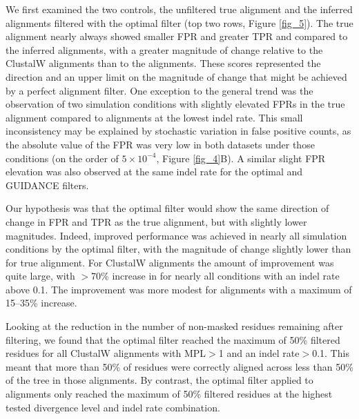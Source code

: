 \documentclass{article}
\begin{document}
We first examined the two controls, the unfiltered true alignment and
the inferred alignments filtered with the optimal filter (top two
rows, Figure \ref{fig_5}). The true alignment nearly always showed
smaller FPR and greater TPR and \tpr compared to the inferred
alignments, with a greater magnitude of change relative to the
ClustalW alignments than to the \prankc alignments. These scores
represented the direction and an upper limit on the magnitude of
change that might be achieved by a perfect alignment filter. One
exception to the general trend was the observation of two simulation conditions
with slightly elevated FPRs in the true alignment compared to \prankc alignments at the
lowest indel rate. This small inconsistency may be explained by
stochastic variation in false positive counts, as the absolute value
of the FPR was very low in both datasets under those conditions (on
the order of $5\times10^{-4}$, Figure \ref{fig_4}B). A similar slight FPR
elevation was also observed at the same indel rate for the optimal and
GUIDANCE filters.

Our hypothesis was that the optimal filter would show the same
direction of change in FPR and TPR as the true alignment, but with
slightly lower magnitudes. Indeed, improved \sw performance was
achieved in nearly all simulation conditions by the optimal filter,
with the magnitude of \tpr change slightly lower than for true
alignment. For ClustalW alignments the amount of improvement was quite
large, with $>$70\% increase in \tpr for nearly all conditions with an
indel rate above 0.1. The improvement was more modest for \prankc
alignments with a maximum of 15--35\% \tpr increase.

Looking at the reduction in the number of non-masked residues
remaining after filtering, we found that the optimal filter reached
the maximum of 50\% filtered residues for all ClustalW alignments with
MPL$>$1 and an indel rate$>$0.1. This meant that more than 50\% of
residues were correctly aligned across less than 50\% of the tree in
those alignments. By contrast, the optimal filter applied to \prankc
alignments only reached the maximum of 50\% filtered residues at the
highest tested divergence level and indel rate combination.
\end{document}
